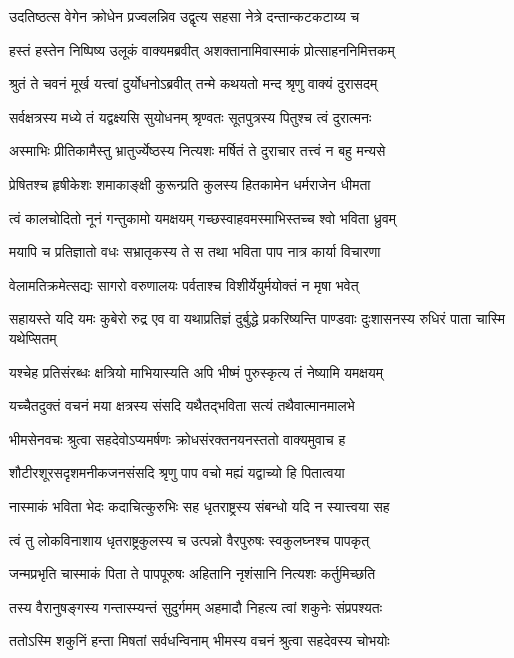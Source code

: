 \twolineshloka
{उदतिष्ठत्स वेगेन क्रोधेन प्रज्वलन्निव}
{उद्वृत्य सहसा नेत्रे दन्तान्कटकटाय्य च}


\twolineshloka
{हस्तं हस्तेन निष्पिष्य उलूकं वाक्यमब्रवीत्}
{अशक्तानामिवास्माकं प्रोत्साहननिमित्तकम्}


\twolineshloka
{श्रुतं ते चवनं मूर्ख यत्त्वां दुर्योधनोऽब्रवीत्}
{तन्मे कथयतो मन्द श्रृणु वाक्यं दुरासदम्}


\twolineshloka
{सर्वक्षत्रस्य मध्ये तं यद्वक्ष्यसि सुयोधनम्}
{श्रृण्वतः सूतपुत्रस्य पितुश्च त्वं दुरात्मनः}


\twolineshloka
{अस्माभिः प्रीतिकामैस्तु भ्रातुर्ज्येष्ठस्य नित्यशः}
{मर्षितं ते दुराचार तत्त्वं न बहु मन्यसे}


\twolineshloka
{प्रेषितश्च हृषीकेशः शमाकाङ्क्षी कुरून्प्रति}
{कुलस्य हितकामेन धर्मराजेन धीमता}


\twolineshloka
{त्वं कालचोदितो नूनं गन्तुकामो यमक्षयम्}
{गच्छस्वाहवमस्माभिस्तच्च श्वो भविता ध्रुवम्}


\twolineshloka
{मयापि च प्रतिज्ञातो वधः सभ्रातृकस्य ते}
{स तथा भविता पाप नात्र कार्या विचारणा}


\twolineshloka
{वेलामतिक्रमेत्सद्यः सागरो वरुणालयः}
{पर्वताश्च विशीर्येयुर्मयोक्तं न मृषा भवेत्}


\threelineshloka
{सहायस्ते यदि यमः कुबेरो रुद्र एव वा}
{यथाप्रतिज्ञं दुर्बुद्धे प्रकरिष्यन्ति पाण्डवाः}
{दुःशासनस्य रुधिरं पाता चास्मि यथेप्सितम्}


\twolineshloka
{यश्चेह प्रतिसंरब्धः क्षत्रियो माभियास्यति}
{अपि भीष्मं पुरुस्कृत्य तं नेष्यामि यमक्षयम्}


\twolineshloka
{यच्चैतदुक्तं वचनं मया क्षत्रस्य संसदि}
{यथैतद्भविता सत्यं तथैवात्मानमालभे}


\twolineshloka
{भीमसेनवचः श्रुत्वा सहदेवोऽप्यमर्षणः}
{क्रोधसंरक्तनयनस्ततो वाक्यमुवाच ह}


\twolineshloka
{शौटीरशूरसदृशमनीकजनसंसदि}
{श्रृणु पाप वचो मह्यं यद्वाच्यो हि पितात्वया}


\twolineshloka
{नास्माकं भविता भेदः कदाचित्कुरुभिः सह}
{धृतराष्ट्रस्य संबन्धो यदि न स्यात्त्वया सह}


\twolineshloka
{त्वं तु लोकविनाशाय धृतराष्ट्रकुलस्य च}
{उत्पन्नो वैरपुरुषः स्वकुलघ्नश्च पापकृत्}


\twolineshloka
{जन्मप्रभृति चास्माकं पिता ते पापपूरुषः}
{अहितानि नृशंसानि नित्यशः कर्तुमिच्छति}


\twolineshloka
{तस्य वैरानुषङ्गस्य गन्तास्म्यन्तं सुदुर्गमम्}
{अहमादौ निहत्य त्वां शकुनेः संप्रपश्यतः}


\twolineshloka
{ततोऽस्मि शकुनिं हन्ता मिषतां सर्वधन्विनाम्}
{भीमस्य वचनं श्रुत्वा सहदेवस्य चोभयोः}


